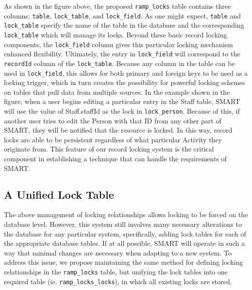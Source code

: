 \documentclass[12pt]{article}
\newcommand{\code}[1]{\texttt{#1}}
\begin{document}
As shown in the figure above, the proposed \code{ramp\_locks} table contains three columns: \code{table}, \code{lock\_table}, and \code{lock\_field}. As one might expect, \code{table} and \code{lock\_table} specify the name of the table in the database and the corresponding \code{lock\_table} which will manage its locks. Beyond these basic record locking components, the \code{lock\_field} column gives this particular locking mechanism enhanced flexibility. Ultimately, the entry in \code{lock\_field} will correspond to the \code{recordId} column of the \code{lock\_table}. Because any column in the table can be used in \code{lock\_field}, this allows for both primary and foreign keys to be used as a locking trigger, which in turn creates the possibility for powerful locking schemes on tables that pull data from multiple sources. In the example shown in the figure, when a user begins editing a particular entry in the Staff table, SMART will use the value of Staff.staffId as the lock in \code{lock\_person}. Because of this, if another user tries to edit the Person with that ID from any other part of SMART, they will be notified that the resource is locked. In this way, record locks are able to be persistent regardless of what particular Activity they originate from. This feature of our record locking system is the critical component in establishing a technique that can handle the requirements of SMART.

\subsection{A Unified Lock Table}
The above management of locking relationships allows locking to be forced on the database level. However, this system still involves many necessary alterations to the database for any particular system, specifically, adding lock tables for each of the appropriate database tables. If at all possible, SMART will operate in such a way that minimal changes are necessary when adapting to a new system. To address this issue, we propose maintaining the same method for defining locking relationships in the \code{ramp\_locks} table, but unifying the lock tables into one required table (ie. \code{ramp\_locks\_locks}), in which all existing locks are stored.
\end{document}
